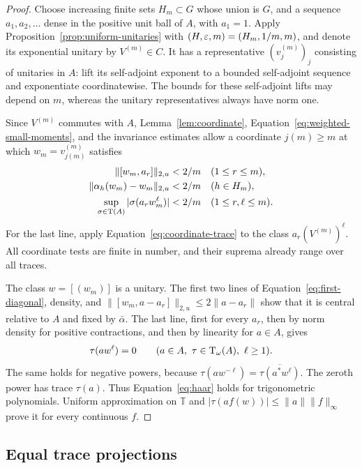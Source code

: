 \begin{proof}
Choose increasing finite sets \(H_m\subset G\) whose union is \(G\),
and a sequence \(a_1,a_2,\ldots\) dense in the positive unit ball of
\(A\), with \(a_1=1\). Apply
Proposition~\ref{prop:uniform-unitaries} with
\((H,\varepsilon,m)=(H_m,1/m,m)\), and denote its exponential unitary by
\(V^{(m)}\in C\).
It has a representative \((v^{(m)}_j)_j\) consisting of unitaries
in \(A\): lift its self-adjoint exponent to a bounded self-adjoint
sequence and exponentiate coordinatewise. The bounds for these
self-adjoint lifts may depend on \(m\), whereas the unitary
representatives always have norm one.

Since \(V^{(m)}\) commutes with \(A\), Lemma~\ref{lem:coordinate},
Equation~\eqref{eq:weighted-small-moments}, and the invariance
estimates allow a coordinate \(j(m)\geq m\) at which
\(w_m=v^{(m)}_{j(m)}\) satisfies
\begin{align}
 \|[w_m,a_r]\|_{2,u}&<2/m &&(1\leq r\leq m),\label{eq:first-diagonal}\\
 \|\alpha_h(w_m)-w_m\|_{2,u}&<2/m &&(h\in H_m),\notag\\
 \sup_{\sigma\in\operatorname{T}(A)}|\sigma(a_r w_m^\ell)|
   &<2/m &&(1\leq r,\ell\leq m).\notag
\end{align}
For the last line, apply Equation~\eqref{eq:coordinate-trace} to
the class \(a_r(V^{(m)})^\ell\). All coordinate tests are finite in
number, and their suprema already range over all traces.

The class \(w=[(w_m)]\) is a unitary. The first two lines of
Equation~\eqref{eq:first-diagonal}, density, and
\(\|[w_m,a-a_r]\|_{2,u}\leq2\|a-a_r\|\) show that it is central
relative to \(A\) and fixed by \(\bar\alpha\).
The last line, first for every \(a_r\), then by norm density for
positive contractions, and then by linearity for \(a\in A\), gives
\[
 \tau(aw^\ell)=0
 \qquad(a\in A,\ \tau\in\operatorname{T}_\omega(A),\ \ell\geq1).
\]
The same holds for negative powers, because
\(\tau(aw^{-\ell})=\overline{\tau(a^*w^\ell)}\).
The zeroth power has trace \(\tau(a)\).
Thus Equation~\eqref{eq:haar} holds for trigonometric polynomials.
Uniform approximation on \(\mathbb T\) and
\(|\tau(a f(w))|\leq\|a\|\|f\|_\infty\) prove it for every continuous
\(f\).
\end{proof}

\subsection{Equal trace projections}

